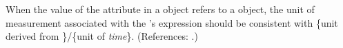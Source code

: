 When the value of the attribute  in a \RateRule object
refers to a \SpeciesReference object, the unit of measurement associated
with the \RateRule's  expression should be consistent with
\{unit derived from \}/\{unit of \emph{time}\}.
(References: .)
